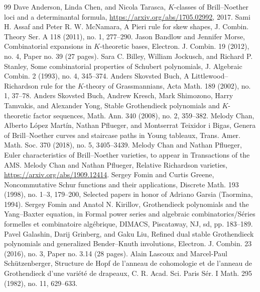 \begin{thebibliography}{99}
 Dave Anderson, Linda Chen, and Nicola Tarasca, $K$-classes of Brill--Noether loci and a determinantal formula, \url{https://arxiv.org/abs/1705.02992}, 2017.
 Sami H. Assaf and Peter R. W. McNamara, A Pieri rule for skew shapes, J. Combin. Theory Ser. A 118 (2011), no. 1, 277--290.
 Jason Bandlow and Jennifer Morse, Combinatorial expansions in $K$-theoretic bases, Electron. J. Combin. 19 (2012), no. 4, Paper no. 39 (27 pages).
 Sara C. Billey, William Jockusch, and Richard P. Stanley, Some combinatorial properties of Schubert polynomials, J. Algebraic Combin. 2 (1993), no. 4, 345--374.
 Anders Skovsted Buch, A Littlewood--Richardson rule for the $K$-theory of Grassmannians, Acta Math. 189 (2002), no. 1, 37--78.
 Anders Skovsted Buch, Andrew Kresch, Mark Shimozono, Harry Tamvakis, and Alexander Yong, Stable Grothendieck polynomials and $K$-theoretic factor sequences, Math. Ann. 340 (2008), no. 2, 359--382.
 Melody Chan, Alberto L\'opez Mart\'in, Nathan Pflueger, and Montserrat Teixidor i Bigas, Genera of Brill--Noether curves and staircase paths in Young tableaux, Trans. Amer. Math. Soc. 370 (2018), no. 5, 3405--3439.
 Melody Chan and Nathan Pflueger, Euler characteristics of Brill--Noether varieties, to appear in Transactions of the AMS.
 Melody Chan and Nathan Pflueger, Relative Richardson varieties, \url{https://arxiv.org/abs/1909.12414}.
 Sergey Fomin and Curtis Greene, Noncommutative Schur functions and their applications, Discrete Math. 193 (1998), no. 1--3, 179--200, Selected papers in honor of Adriano Garsia (Taormina, 1994).
 Sergey Fomin and Anatol N. Kirillov, Grothendieck polynomials and the Yang--Baxter equation, in Formal power series and algebraic combinatorics/S\'eries formelles et combinatoire alg\'ebrique, DIMACS, Piscataway, NJ, sd, pp. 183--189.
 Pavel Galashin, Darij Grinberg, and Gaku Liu, Refined dual stable Grothendieck polynomials and generalized Bender--Knuth involutions, Electron. J. Combin. 23 (2016), no. 3, Paper no. 3.14 (28 pages).
 Alain Lascoux and Marcel-Paul Sch\"utzenberger, Structure de Hopf de l\textquoteright anneau de cohomologie et de l\textquoteright anneau de Grothendieck d\textquoteright une vari\'et\'e de drapeaux, C. R. Acad. Sci. Paris S\'er. I Math. 295 (1982), no. 11, 629--633.

\end{thebibliography}
